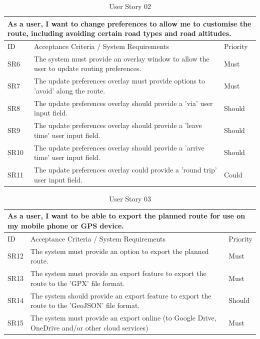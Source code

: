 \begin{table}[!htb]
  \caption{User Story 02}
  \label{tab:user-story-02}
  \begin{tabular}{ m{1cm} m{11cm} m{1cm} }
  \hline
  \multicolumn{3}{p{13cm}}{As a user, I want to change preferences to allow me to customise the route, including avoiding certain road types and road altitudes.}\\ 
  \hline
  ID & Acceptance Criteria / System Requirements & Priority\\
  \hline
  \label{SR:6}SR6 & The system must provide an overlay window to allow the user to update routing preferences. & Must \\
  \label{SR:7}SR7 & The update preferences overlay must provide options to 'avoid' along the route. & Must\\
  \label{SR:8}SR8 & The update preferences overlay should provide a 'via' user input field. & Should\\ 
  \label{SR:9}SR9 & The update preferences overlay should provide a 'leave time' user input field. & Should\\ 
  \label{SR:10}SR10 & The update preferences overlay should provide a 'arrive time' user input field. & Should\\ 
  \label{SR:11}SR11 & The update preferences overlay could provide a 'round trip' user input field. & Could\\ 
  \hline
  \end{tabular}
\end{table}

\begin{table}[!htb]
  \caption{User Story 03}
  \label{tab:user-story-03}
  \begin{tabular}{ m{1cm} m{11cm} m{1cm} }
  \hline
  \multicolumn{3}{p{13cm}}{As a user, I want to be able to export the planned route for use on my mobile phone or GPS device.}\\ 
  \hline
  ID & Acceptance Criteria / System Requirements & Priority\\
  \hline
  \label{SR:12}SR12 & The system must provide an option to export the planned route. & Must \\
  \label{SR:13}SR13 & The system must provide an export feature to export the route to the 'GPX' file format. & Must\\
  \label{SR:14}SR14 & The system should provide an export feature to export the route to the 'GeoJSON' file format. & Should\\ 
  \label{SR:15}SR15 & The system must provide an export online (to Google Drive, OneDrive and/or other cloud services) & Must\\
  \hline
  \end{tabular}
\end{table}

